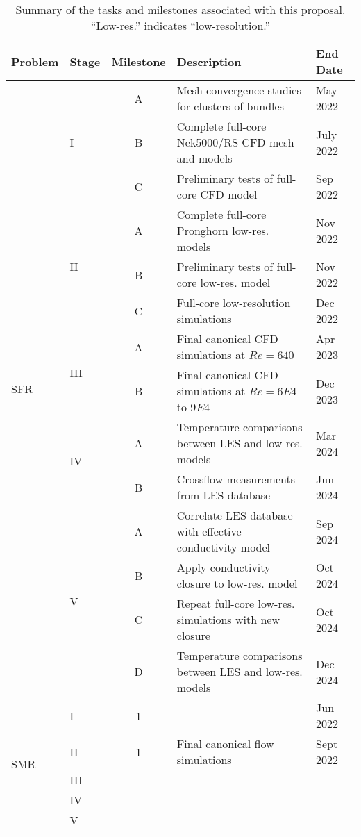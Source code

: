 \begin{table}[h!]
\centering
\caption{Summary of the tasks and milestones associated with this proposal. ``Low-res.'' indicates ``low-resolution.''}
\begin{tabular}{l l c l l}
\toprule
Problem & Stage & Milestone & Description & End Date \\
\midrule
\multirow{14}{*}{SFR} & \multirow{3}{*}{I} & A & Mesh convergence studies for clusters of bundles & May 2022 \\
& & B & Complete full-core Nek5000/RS CFD mesh and models & July 2022\\
& & C & Preliminary tests of full-core CFD model & Sep 2022\\\cmidrule{2-5}
& \multirow{3}{*}{II} & A & Complete full-core Pronghorn low-res. models & Nov 2022 \\
& & B & Preliminary tests of full-core low-res. model & Nov 2022\\
& & C & Full-core low-resolution simulations & Dec 2022\\\cmidrule{2-5}
& \multirow{2}{*}{III} & A & Final canonical CFD simulations at \(Re=640\) & Apr 2023\\
& & B & Final canonical CFD simulations at \(Re=6E4\) to \(9E4\) & Dec 2023\\\cmidrule{2-5}
& \multirow{2}{*}{IV} & A & Temperature comparisons between LES and low-res. models & Mar 2024\\
& & B & Crossflow measurements from LES database & Jun 2024\\\cmidrule{2-5}
& \multirow{4}{*}{V} & A & Correlate LES database with effective conductivity model & Sep 2024\\
& & B & Apply conductivity closure to low-res. model & Oct 2024\\
& & C & Repeat full-core low-res. simulations with new closure & Oct 2024\\
& & D & Temperature comparisons between LES and low-res. models & Dec 2024\\
\midrule
\multirow{5}{*}{SMR} & I & 1 &    & Jun  2022 \\
& II & 1 & Final canonical flow simulations         & Sept 2022 \\
& III & \\
& IV & \\
& V & \\
\bottomrule
\end{tabular}
\label{tab:milestones}
\end{table}

